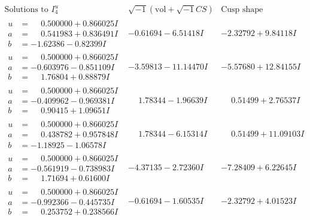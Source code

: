 \documentclass[1p]{elsarticle_modified}
\theoremstyle{definition}
\newcommand{\I}{\sqrt{-1}}
\begin{document}
$$\begin{array}{c|c|c}  
\text{Solutions to }I^u_{4}& \I (\text{vol} + \sqrt{-1}CS) & \text{Cusp shape}\\
 \hline 
\begin{aligned}
u &= \phantom{-}0.500000 + 0.866025 I \\
a &= \phantom{-}0.541983 + 0.836491 I \\
b &= -1.62386 - 0.82399 I\end{aligned}
 & -0.61694 - 6.51418 I & -2.32792 + 9.84118 I \\ \hline\begin{aligned}
u &= \phantom{-}0.500000 + 0.866025 I \\
a &= -0.603976 - 0.851109 I \\
b &= \phantom{-}1.76804 + 0.88879 I\end{aligned}
 & -3.59813 - 11.14470 I & -5.57680 + 12.84155 I \\ \hline\begin{aligned}
u &= \phantom{-}0.500000 + 0.866025 I \\
a &= -0.409962 - 0.969381 I \\
b &= \phantom{-}0.90415 + 1.09651 I\end{aligned}
 & \phantom{-}1.78344 - 1.96639 I & \phantom{-}0.51499 + 2.76537 I \\ \hline\begin{aligned}
u &= \phantom{-}0.500000 + 0.866025 I \\
a &= \phantom{-}0.438782 + 0.957848 I \\
b &= -1.18925 - 1.06578 I\end{aligned}
 & \phantom{-}1.78344 - 6.15314 I & \phantom{-}0.51499 + 11.09103 I \\ \hline\begin{aligned}
u &= \phantom{-}0.500000 + 0.866025 I \\
a &= -0.561919 - 0.738983 I \\
b &= \phantom{-}1.71694 + 0.61600 I\end{aligned}
 & -4.37135 - 2.72360 I & -7.28409 + 6.22645 I \\ \hline\begin{aligned}
u &= \phantom{-}0.500000 + 0.866025 I \\
a &= -0.992366 - 0.445735 I \\
b &= \phantom{-}0.253752 + 0.238566 I\end{aligned}
 & -0.61694 - 1.60535 I & -2.32792 + 4.01523 I \\ \hline\begin{aligned}

\end{aligned}
\end{array}$$
\end{document}
